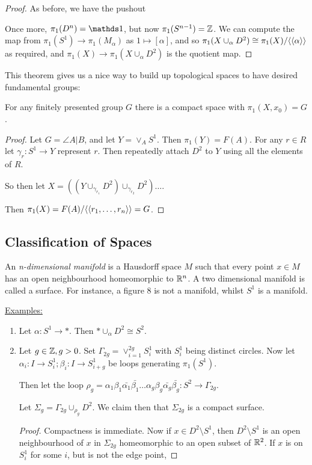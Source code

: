 \documentclass[10pt,a4paper]{article}
\begin{document}
\begin{proof}
As before, we have the pushout
\begin{center}
\end{center}
Once more, $\pi_1(D^n) = \one$, but now $\pi_1(S^{n-1}) = \mathbb{Z}$. We can compute the map from $\pi_1(S^1) \to \pi_1(M_{\alpha})$ as $1 \mapsto [\alpha]$, and so $\pi_1(X\cup_{\alpha} D^2) \cong \pi_1(X)/\langle \langle \alpha \rangle \rangle$ as required, and $\pi_1(X) \to \pi_1(X\cup_{\alpha} D^2)$ is the quotient map.
\end{proof}
This theorem gives us a nice way to build up topological spaces to have desired fundamental groups:
\begin{theorem}
For any finitely presented group $G$ there is a compact space with $\pi_1(X, x_0) = G$.
\end{theorem}
\begin{proof}
Let $G = \angle{A|B}$, and let $Y = \vee_A S^1$. Then $\pi_1(Y) = F(A)$. For any $r \in R$ let $\gamma_r : S^1 \to Y$ represent $r$. Then repeatedly attach $D^2$ to $Y$ using all the elements of $R$. 

So then let $X = ((Y \cup_{\gamma_{r_1}} D^2) \cup_{\gamma_{r_2}} D^2 ) \ldots$.

Then $\pi_1(X) = F(A)/\langle \langle r_1, \ldots, r_n \rangle \rangle = G$.
\end{proof}

\subsection*{Classification of Spaces}
An \emph{n-dimensional manifold} is a Hausdorff space $M$ such that every point $x \in M$ has an open neighbourhood homeomorphic to $\mathbb{R}^n$. A two dimensional manifold is called a surface. For instance, a figure 8 is not a manifold, whilst $S^1$ is a manifold.

\underline{Examples:}
\begin{enumerate}
\item Let $\alpha:S^1 \to \ast$. Then $\ast \cup_{\alpha} D^2 \cong S^2$.
\item Let $g \in \mathbb{Z}, g>0$. Set $\Gamma_{2g} = \vee_{i=1}^{2g} S_i^1$ with $S_i^1$ being distinct circles. Now let $\alpha_i: I \to S_i^1; \beta_i : I \to S_{i+g}^1$ be loops generating $\pi_1(S^1)$.

Then let the loop $\rho_g = \alpha_1 \beta_1 \bar{\alpha_1} \bar{\beta_1} \ldots \alpha_g \beta_g \bar{\alpha_g} \bar{\beta_g}:S^2 \to \Gamma_{2g}$.

Let $\Sigma_g = \Gamma_{2g} \cup_{\rho_g} D^2$. We claim then that $\Sigma_{2g}$ is a compact surface.
\begin{proof}
Compactness is immediate. Now if $x \in D^2 \setminus S^1$, then $D^2 \setminus S^1$ is an open neighbourhood of $x$ in $\Sigma_{2g}$ homeomorphic to an open subset of $\mathbb{R}^2$. If $x$ is on $S_i^1$ for some $i$, but is not the edge point,
\end{proof}
\end{enumerate}
\end{document}
